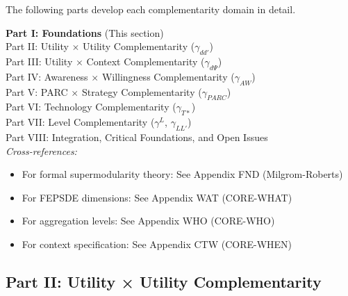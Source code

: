 The following parts develop each complementarity domain in detail.


\vspace{1cm}
\begin{tcolorbox}[colback=gray!10, colframe=gray!50, title=Appendix HOW Structure]
\textbf{Part I: Foundations} (This section) \\
Part II: Utility $\times$ Utility Complementarity ($\gamma_{dd'}$) \\
Part III: Utility $\times$ Context Complementarity ($\gamma_{d\Psi}$) \\
Part IV: Awareness $\times$ Willingness Complementarity ($\gamma_{AW}$) \\
Part V: PARC $\times$ Strategy Complementarity ($\gamma_{PARC}$) \\
Part VI: Technology Complementarity ($\gamma_{T*}$) \\
Part VII: Level Complementarity ($\gamma^L$, $\gamma_{LL'}$) \\
Part VIII: Integration, Critical Foundations, and Open Issues \\

\vspace{0.3cm}
\textit{Cross-references:}
\begin{itemize}
    \item For formal supermodularity theory: See Appendix FND (Milgrom-Roberts)
    \item For FEPSDE dimensions: See Appendix WAT (CORE-WHAT)
    \item For aggregation levels: See Appendix WHO (CORE-WHO)
    \item For context specification: See Appendix CTW (CORE-WHEN)
\end{itemize}
\end{tcolorbox}



\subsection{Part II: Utility × Utility Complementarity}
\label{sec:B-utility-utility}

